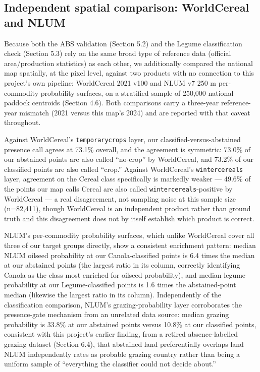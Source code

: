 \subsection{Independent spatial comparison: WorldCereal and NLUM}\label{independent-spatial-comparison-worldcereal-and-nlum}

Because both the ABS validation (Section 5.2) and the Legume classification check (Section 5.3) rely on the same broad type of reference data (official area/production statistics) as each other, we additionally compared the national map spatially, at the pixel level, against two products with no connection to this project's own pipeline: WorldCereal 2021 v100 and NLUM v7 250 m per-commodity probability surfaces, on a stratified sample of 250,000 national paddock centroids (Section 4.6). Both comparisons carry a three-year reference-year mismatch (2021 versus this map's 2024) and are reported with that caveat throughout.

Against WorldCereal's \texttt{temporarycrops} layer, our classified-versus-abstained presence call agrees at 73.1\% overall, and the agreement is symmetric: 73.0\% of our abstained points are also called ``no-crop'' by WorldCereal, and 73.2\% of our classified points are also called ``crop.'' Against WorldCereal's \texttt{wintercereals} layer, agreement on the Cereal class specifically is markedly weaker --- 49.6\% of the points our map calls Cereal are also called \texttt{wintercereals}-positive by WorldCereal --- a real disagreement, not sampling noise at this sample size (n=82,411), though WorldCereal is an independent product rather than ground truth and this disagreement does not by itself establish which product is correct.

NLUM's per-commodity probability surfaces, which unlike WorldCereal cover all three of our target groups directly, show a consistent enrichment pattern: median NLUM oilseed probability at our Canola-classified points is 6.4 times the median at our abstained points (the largest ratio in its column, correctly identifying Canola as the class most enriched for oilseed probability), and median legume probability at our Legume-classified points is 1.6 times the abstained-point median (likewise the largest ratio in its column). Independently of the classification comparison, NLUM's grazing-probability layer corroborates the presence-gate mechanism from an unrelated data source: median grazing probability is 33.8\% at our abstained points versus 10.8\% at our classified points, consistent with this project's earlier finding, from a retired absence-labelled grazing dataset (Section 6.4), that abstained land preferentially overlaps land NLUM independently rates as probable grazing country rather than being a uniform sample of ``everything the classifier could not decide about.''

